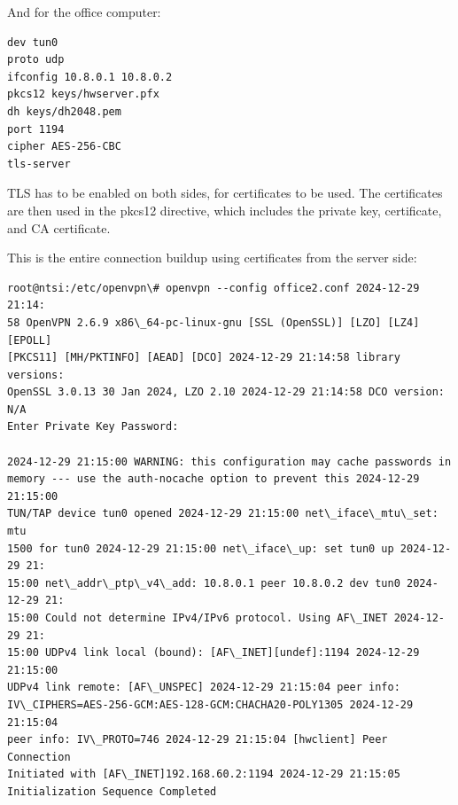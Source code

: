 And for the office computer:

\begin{verbatim}
dev tun0
proto udp
ifconfig 10.8.0.1 10.8.0.2
pkcs12 keys/hwserver.pfx
dh keys/dh2048.pem
port 1194
cipher AES-256-CBC
tls-server
\end{verbatim}

TLS has to be enabled on both sides, for certificates to be used. The certificates are then used in the pkcs12 directive, which includes the private key, certificate, and CA certificate.

This is the entire connection buildup using certificates from the server side:

\begin{verbatim}
root@ntsi:/etc/openvpn\# openvpn --config office2.conf 2024-12-29 21:14:
58 OpenVPN 2.6.9 x86\_64-pc-linux-gnu [SSL (OpenSSL)] [LZO] [LZ4] [EPOLL]
[PKCS11] [MH/PKTINFO] [AEAD] [DCO] 2024-12-29 21:14:58 library versions:
OpenSSL 3.0.13 30 Jan 2024, LZO 2.10 2024-12-29 21:14:58 DCO version: N/A
Enter Private Key Password:

2024-12-29 21:15:00 WARNING: this configuration may cache passwords in
memory --- use the auth-nocache option to prevent this 2024-12-29 21:15:00
TUN/TAP device tun0 opened 2024-12-29 21:15:00 net\_iface\_mtu\_set: mtu
1500 for tun0 2024-12-29 21:15:00 net\_iface\_up: set tun0 up 2024-12-29 21:
15:00 net\_addr\_ptp\_v4\_add: 10.8.0.1 peer 10.8.0.2 dev tun0 2024-12-29 21:
15:00 Could not determine IPv4/IPv6 protocol. Using AF\_INET 2024-12-29 21:
15:00 UDPv4 link local (bound): [AF\_INET][undef]:1194 2024-12-29 21:15:00
UDPv4 link remote: [AF\_UNSPEC] 2024-12-29 21:15:04 peer info:
IV\_CIPHERS=AES-256-GCM:AES-128-GCM:CHACHA20-POLY1305 2024-12-29 21:15:04
peer info: IV\_PROTO=746 2024-12-29 21:15:04 [hwclient] Peer Connection
Initiated with [AF\_INET]192.168.60.2:1194 2024-12-29 21:15:05
Initialization Sequence Completed
\end{verbatim}